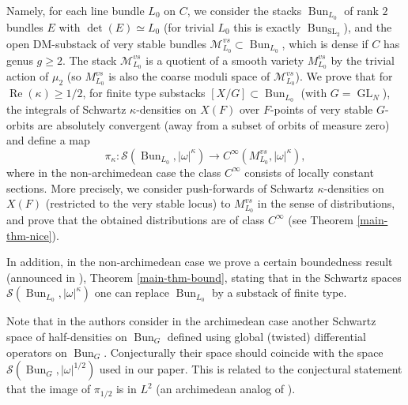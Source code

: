 \documentclass[12pt,reqno]{amsart}
\theoremstyle{definition}
\theoremstyle{remark}
\numberwithin{equation}{section}
\renewcommand{\SS}{{\mathcal S}}
\newcommand{\MM}{{\mathcal M}}
\newcommand{\sub}{\subset}
\newcommand{\om}{\omega}
\newcommand{\GL}{\operatorname{GL}}
\newcommand{\SL}{{\operatorname{SL}}}
\newcommand{\Bun}{{\operatorname{Bun}}}
\renewcommand{\Re}{{\operatorname{Re}}}
\begin{document}
Namely, for each line bundle $L_0$ on $C$, we consider the stacks $\Bun_{L_0}$ of rank $2$ bundles $E$ with $\det(E)\simeq L_0$ (for trivial $L_0$ this is exactly
$\Bun_{\SL_2}$), and the open DM-substack of very stable bundles $\MM_{L_0}^{vs}\sub \Bun_{L_0}$, which is dense if $C$ has genus $g\ge 2$. 
The stack $\MM_{L_0}^{vs}$ is a quotient of a smooth variety $M_{L_0}^{vs}$ by the trivial action of $\mu_2$ (so $M_{L_0}^{vs}$ is also the coarse moduli space of $\MM^{vs}_{L_0}$).
We prove
that for $\Re(\kappa)\ge 1/2$, for finite type substacks $[X/G]\sub \Bun_{L_0}$ (with $G=\GL_N$), the integrals of Schwartz $\kappa$-densities on $X(F)$ 
over $F$-points of very stable $G$-orbits are absolutely convergent (away from a subset of orbits of measure zero) and define a map
$$\pi_{\kappa}:\SS(\Bun_{L_0},|\om|^{\kappa})\to C^\infty(M_{L_0}^{vs},|\om|^{\kappa}),$$ 
where in the non-archimedean case the class $C^\infty$ consists of locally constant sections.  
More precisely, we consider push-forwards of Schwartz $\kappa$-densities on $X(F)$ (restricted to the very stable locus) to $M_{L_0}^{vs}$ in the sense of distributions,
and prove that the obtained distributions are of class $C^\infty$ (see Theorem \ref{main-thm-nice}).

In addition, in the non-archimedean case we prove a certain boundedness result (announced in \cite{BK}), Theorem \ref{main-thm-bound}, stating that in the Schwartz spaces 
$\SS(\Bun_{L_0},|\om|^{\kappa})$ one can replace $\Bun_{L_0}$ by a substack of finite type.

Note that in \cite{EFK1} the authors consider in the archimedean case
another Schwartz space of half-densities on $\Bun_G$ defined using global (twisted) differential operators on $\Bun_G$.
Conjecturally their space should coincide with the space $\SS(\Bun_G,|\om|^{1/2})$ used in our paper. This is related to the conjectural statement that the image
of $\pi_{1/2}$ is in $L^2$ (an archimedean analog of \cite[Conj.\ 3.5(3)]{BK}).
\end{document}
